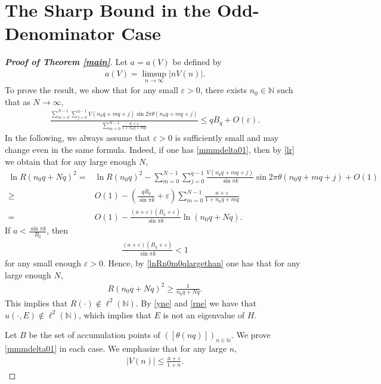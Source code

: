 \documentclass[12pt]{amsart}
\newcommand{\abs}[1]{\left\lvert #1 \right\rvert}
\theoremstyle{plain}
\theoremstyle{definition}
\begin{document}
\section{The Sharp Bound in the Odd-Denominator Case}\label{sec8}
\begin{proof}[\textbf{Proof of Theorem \ref{main}}]Let $a=a(V)$ be defined by
	\begin{align}
		a(V)=\limsup_{n\to \infty}\abs{nV(n)}.\nonumber
	\end{align}
	To prove the result, we show that for any small $\varepsilon>0$, there exists $n_0 \in\mathbb{N}$ such that as $N\to\infty$,
	\begin{align}\label{mmmdelta01}
	\frac{\sum_{m=0}^{N-1}\sum_{j=0}^{q-1}V(n_0q+mq+j)\sin2\pi\theta(n_0q+mq+j)}{\sum_{m=0}^{N-1}\frac{a+\varepsilon}{1+n_0q+mq}}	\leq
		qB_q+O(\varepsilon).
	\end{align}
In the following, we always assume that $\varepsilon>0$ is sufficiently small and may change even in the same formula. 
	Indeed, if one has \eqref{mmmdelta01}, then by \eqref{lr} we obtain that for any large enough $N$,
	\begin{align}
		\ln R(n_0q+Nq)^2=&\ln R(n_0q)^2
		-\sum_{m=0}^{N-1}\sum_{j=0}^{q-1}\frac{V(n_0q+mq+j)}{\sin\pi k}\sin2\pi\theta(n_0q+mq+j)+O(1)\nonumber\\
		\geq &O(1)-\left(\frac{qB_q}{\sin\pi k}+\varepsilon\right)\sum_{m=0}^{N-1}\frac{a+\varepsilon}{1+n_0q+mq}\nonumber\\
		=&O(1)-\frac{(a+\varepsilon)(B_q+\varepsilon)}{\sin\pi k}\ln (n_0q+Nq).\label{lnRn0m0qlargethan}
	\end{align}
	If $a<\frac{\sin\pi k}{B_q}$, then 
	\begin{align}
		\frac{(a+\varepsilon)(B_q+\varepsilon)}{\sin\pi k}< 1\nonumber
	\end{align}
		for any small enough $\varepsilon>0$. 
Hence, by \eqref{lnRn0m0qlargethan} one has that for any large enough $N$,
\begin{align}
R(n_0q+Nq)^2\geq \frac{1}{n_0q+Nq}.\nonumber
\end{align}
	This implies that $R(\cdot)\notin \ell^2(\mathbb{N})$. By \eqref{yne} and \eqref{rne} we have that $u(\cdot,E)\notin \ell^2(\mathbb{N})$, which implies that $E$ is not an eigenvalue of $H$.
	
Let $B$ be the set of accumulation points of $(\left[\theta(nq)\right])_{n\in\mathbb{N}}$. We prove \eqref{mmmdelta01} in each case. We emphasize that for any large $n$,
\begin{align}
	\abs{V(n)}\leq \frac{a+\varepsilon}{1+n}\label{fvc}.
\end{align}


\end{proof}
\end{document}
